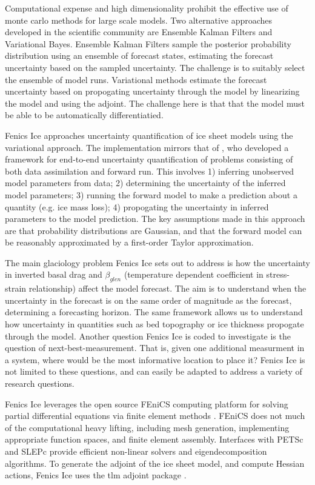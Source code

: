 \documentclass[11pt, reqno, nocenter]{article}
\begin{document}
Computational expense and high dimensionality prohibit the effective use of monte carlo methods for large scale models. Two alternative approaches developed in the scientific community are Ensemble Kalman Filters and Variational Bayes. Ensemble Kalman Filters sample the posterior probability distribution using an ensemble of forecast states, estimating the forecast uncertainty based on the sampled uncertainty. The challenge is to suitably select the ensemble of model runs. Variational methods estimate the forecast uncertainty based on propogating uncertainty through the model by linearizing the model and using the adjoint. The challenge here is that that the model must be able to be automatically differentiatied.

Fenics Ice approaches uncertainty quantification of ice sheet models using the variational approach. The implementation mirrors that of \cite{Isaac2015}, who developed a framework for end-to-end uncertainty quantification of problems consisting of both data assimilation and forward run. This involves 1) inferring unobserved model parameters from data; 2) determining the uncertainty of the inferred model parameters; 3) running the forward model to make a prediction about a quantity (e.g. ice mass loss); 4) propogating the uncertainty in inferred parameters to the model prediction. The key assumptions made in this approach are that probability distributions are Gaussian, and that the forward model can be reasonably approximated by a first-order Taylor approximation.

The main glaciology problem Fenics Ice sets out to address is how the uncertainty in inverted basal drag and $\beta_{glen}$ (temperature dependent coefficient in stress-strain relationship) affect the model forecast. The aim is to understand when the uncertainty in the forecast is on the same order of magnitude as the forecast, determining a forecasting horizon. The same framework allows us to understand how uncertainty in quantities such as bed topography or ice thickness propogate through the model. Another question Fenics Ice is coded to investigate is the question of next-best-measurement. That is, given one additional measurment in a system, where would be the most informative location to place it? Fenics Ice is not limited to these questions, and can easily be adapted to address a variety of research questions. 

Fenics Ice leverages the open source FEniCS computing platform for solving partial differential equations via finite element methods \cite{AlnaesBlechta2015a}. FEniCS does not much of the computational heavy lifting, including mesh generation, implementing appropriate function spaces, and finite element assembly. Interfaces with PETSc and SLEPc provide efficient non-linear solvers and eigendecomposition algorithms. To generate the adjoint of the ice sheet model, and compute Hessian actions, Fenics Ice uses the tlm adjoint package \cite{Maddison2019}. 
\end{document}
